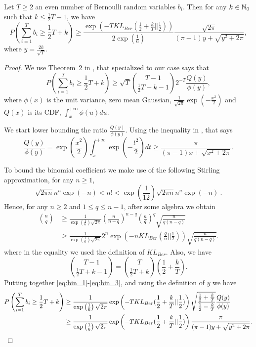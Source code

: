 \begin{theorem}
\label{lemma:bin}
Let $T\geq2$ an even number of Bernoulli random variables $b_i$. Then for any $k \in \mathbb{N}_0$ such that $k\leq \frac{1}{2}T-1$, we have
\[
P\left( \sum_{i=1}^T b_i \geq \frac{1}{2} T + k\right) 
\geq  \frac{\exp\left(-T KL_{Ber}(\frac{1}{2}+\frac{k}{T}||\frac{1}{2})\right)}{2 \exp\left(\frac{1}{6}\right)} \frac{\sqrt{2 \pi}}{(\pi-1)y+\sqrt{y^2+2 \pi}},
\]
where $y=\frac{2 k}{\sqrt{T}}$.
\end{theorem}
\begin{proof}
We use Theorem~2 in \cite{McKay1989}, that specialized to our case says that
\begin{equation}
\label{eq:bin_1}
P\left( \sum_{i=1}^T b_i \geq  \frac{1}{2} T + k  \right) 
\geq \sqrt{T} \binom{T-1}{ \frac{1}{2} T + k -1} 2^{-T} \frac{Q(y)}{\phi(y)},
\end{equation}
where $\phi(x)$ is the unit variance, zero mean Gaussian, $\frac{1}{\sqrt{2 \pi}} \exp(-\frac{x^2}{2})$ and $Q(x)$ is its CDF, $\int_{x}^{+\infty} \phi(u) du$.

We start lower bounding the ratio $\frac{Q(y)}{\phi(y)}$. Using the inequality in \cite{Boyd59}, that says
\[
\frac{Q(y)}{\phi(y)} 
= \exp\left(\frac{x^2}{2}\right) \int_{x}^{+\infty} \exp\left(-\frac{t^2}{2}\right) dt
\geq \frac{\pi}{(\pi-1)x+\sqrt{x^2+2 \pi}}.
\]

To bound the binomial coefficient we make use of the following Stirling approximation, for any $n\geq 1$,
\[
\sqrt{2 \pi n} n^n \exp(-n) < n! < \exp\left(\frac{1}{12}\right)\sqrt{2 \pi n} n^n \exp(-n)~.
\]
Hence, for any $n \geq 2$ and $1\leq q \leq n-1$, after some algebra we obtain
\begin{align*}
{n \choose q} 
&\geq \frac{1}{\exp\left(\frac{1}{6}\right) \sqrt{2 \pi}} \left(\frac{n}{n-q}\right)^{n-q} \left(\frac{n}{q}\right)^{q} \sqrt{\frac{n}{q(n-q)}} \\
&\geq \frac{1}{\exp\left(\frac{1}{6}\right) \sqrt{2 \pi}} 2^n \exp\left(-n KL_{Ber}(\frac{q}{n}||\frac{1}{2})\right) \sqrt{\frac{n}{q(n-q)}}.
\end{align*}
where in the equality we used the definition of $KL_{Ber}$.
Also, we have
\begin{equation}
\label{eq:bin_3}
{T-1 \choose \frac{1}{2} T + k - 1} = {T \choose \frac{1}{2} T + k} \left(\frac{1}{2} + \frac{k}{T}\right) .
\end{equation}
Putting together \eqref{eq:bin_1}-\eqref{eq:bin_3}, and using the definition of $y$ we have
\begin{align*}
P\left( \sum_{i=1}^T b_i \geq \frac{1}{2} T + k \right) 
&\geq \frac{1}{\exp\left(\frac{1}{6}\right) \sqrt{2 \pi}} \exp\left(-T KL_{Ber}(\frac{1}{2}+\frac{k}{T}||\frac{1}{2})\right) \sqrt{\frac{\frac{1}{2} + \frac{k}{T}}{\frac{1}{2}-\frac{k}{T}}}  \frac{Q(y)}{\phi(y)} \\
&\geq \frac{1}{\exp\left(\frac{1}{6}\right) \sqrt{2 \pi}} \exp\left(-T KL_{Ber}(\frac{1}{2}+\frac{k}{T}||\frac{1}{2})\right) \frac{\pi}{(\pi-1)y+\sqrt{y^2+2 \pi}}. \qedhere
\end{align*}
\end{proof}


